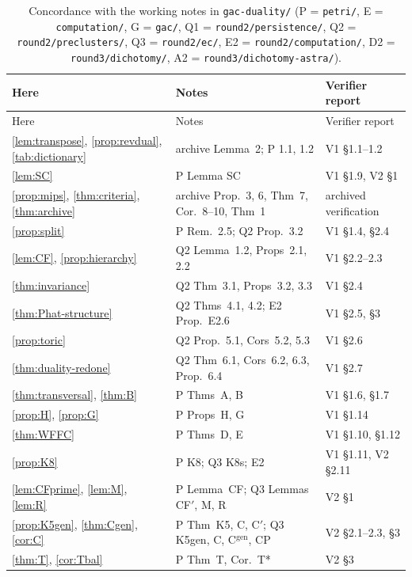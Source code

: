 \documentclass[11pt,a4paper]{report}
\begin{document}
{\small
\def\LTcaptype{table}
\setlength{\LTpre}{4pt}
\begin{longtable}{>{\raggedright\arraybackslash}p{2.4cm}>{\raggedright\arraybackslash}p{6.0cm}>{\raggedright\arraybackslash}p{4.6cm}}
\caption{Concordance with the working notes in \texttt{gac-duality/} (P = \texttt{petri/}, E = \texttt{computation/},
G = \texttt{gac/}, Q1 = \texttt{round2/persistence/}, Q2 = \texttt{round2/preclusters/}, Q3 = \texttt{round2/ec/},
E2 = \texttt{round2/computation/}, D2 = \texttt{round3/dichotomy/}, A2 = \texttt{round3/dichotomy-astra/}).}\label{tab:concordance}\\
\hline
Here & Notes & Verifier report \\
\hline
\endfirsthead
\hline
Here & Notes & Verifier report \\
\hline
\endhead
\ref{lem:transpose}, \ref{prop:revdual}, \ref{tab:dictionary} & archive Lemma~2; P 1.1, 1.2 & V1 §1.1--1.2 \\
\ref{lem:SC} & P Lemma SC & V1 §1.9, V2 §1 \\
\ref{prop:mips}, \ref{thm:criteria}, \ref{thm:archive} & archive Prop.~3, 6, Thm~7, Cor.~8--10, Thm~1 & archived verification \\
\ref{prop:split} & P Rem.~2.5; Q2 Prop.~3.2 & V1 §1.4, §2.4 \\
\ref{lem:CF}, \ref{prop:hierarchy} & Q2 Lemma~1.2, Props~2.1, 2.2 & V1 §2.2--2.3 \\
\ref{thm:invariance} & Q2 Thm~3.1, Props~3.2, 3.3 & V1 §2.4 \\
\ref{thm:Phat-structure} & Q2 Thms~4.1, 4.2; E2 Prop.~E2.6 & V1 §2.5, §3 \\
\ref{prop:toric} & Q2 Prop.~5.1, Cors~5.2, 5.3 & V1 §2.6 \\
\ref{thm:duality-redone} & Q2 Thm~6.1, Cors~6.2, 6.3, Prop.~6.4 & V1 §2.7 \\
\ref{thm:transversal}, \ref{thm:B} & P Thms~A, B & V1 §1.6, §1.7 \\
\ref{prop:H}, \ref{prop:G} & P Props~H, G & V1 §1.14 \\
\ref{thm:WFFC} & P Thms~D, E & V1 §1.10, §1.12 \\
\ref{prop:K8} & P K8; Q3 K8s; E2 & V1 §1.11, V2 §2.11 \\
\ref{lem:CFprime}, \ref{lem:M}, \ref{lem:R} & P Lemma~CF; Q3 Lemmas CF\('\), M, R & V2 §1 \\
\ref{prop:K5gen}, \ref{thm:Cgen}, \ref{cor:C} & P Thm~K5, C, C\('\); Q3 K5gen, C, C\(^{\mathrm{gen}}\), CP & V2 §2.1--2.3, §3 \\
\ref{thm:T}, \ref{cor:Tbal} & P Thm~T, Cor.~T* & V2 §3 \\

\end{longtable}}
\end{document}

